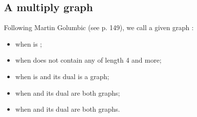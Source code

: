 \documentclass[a4paper,12pt,english]{sphinxhowto}
\begin{document}
\subsection{A multiply  graph}
\label{\detokenize{tutorial:a-multiply-perfect-graph}}
Following Martin Golumbic (see  p. 149), we call a given graph :
\begin{itemize}
\item {} 
 when   is ;

\item {} 
 when  does not contain any  of length 4 and more;

\item {} 
 when  is  and its dual  is a  graph;

\item {} 
 when  and its dual  are both  graphs;

\item {} 
 when  and its dual  are both  graphs.

\end{itemize}
\end{document}
